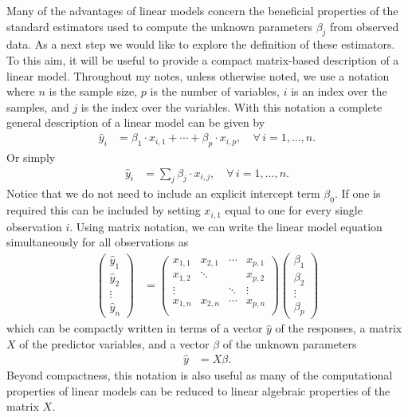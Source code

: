 \documentclass[12pt,hidelinks]{article}
\numberwithin{equation}{section}
\begin{document}
Many of the advantages of linear models concern the beneficial properties
of the standard estimators used to compute the unknown parameters
$\beta_j$ from observed data. As a next step we would like to explore
the definition of these estimators. To this aim, it will be useful to
provide a compact matrix-based description of a linear model. Throughout
my notes, unless otherwise noted, we use a notation where $n$ is the
sample size, $p$ is the number of variables, $i$ is an index over the
samples, and $j$ is the index over the variables. With this notation a
complete general description of a linear model can be given by
\begin{align}
\widehat{y}_i &= \beta_1 \cdot x_{i,1} + \cdots + \beta_p \cdot x_{i,p}, \quad \forall\,  i = 1, \ldots, n.
\end{align}
Or simply
\begin{align}
\widehat{y}_i &= \sum_j \beta_j \cdot x_{i,j}, \quad \forall\,  i = 1, \ldots, n.
\end{align}
Notice that we do not need to include an explicit intercept term
$\beta_0$. If one is required this can be included by setting
$x_{i,1}$ equal to one for every single observation $i$. Using
matrix notation, we can write the linear model equation
simultaneously for all observations as
\begin{align}
\left(\begin{array}{c}\widehat{y}_1\\ \widehat{y}_2\\ \vdots\\ \widehat{y}_n\end{array}\right) &=
  \left(\begin{array}{cccc}x_{1,1}&x_{2,1}&\cdots&x_{p,1}\\
                           x_{1,2}&\ddots&&x_{p,2}\\
                           \vdots&&\ddots&\vdots\\
                           x_{1,n}&x_{2,n}&\cdots&x_{p,n}\\\end{array}\right)
  \left(\begin{array}{c}\beta_1\\ \beta_2\\ \vdots\\ \beta_p\end{array}\right)
\end{align}
which can be compactly written in terms of a vector $\widehat{y}$ of the responses,
a matrix $X$ of the predictor variables, and a vector $\beta$ of the unknown
parameters
\begin{align}
\widehat{y} &= X \beta.
\end{align}
Beyond compactness, this notation is also useful as many of the computational
properties of linear models can be reduced to linear algebraic properties of
the matrix $X$.
\end{document}
